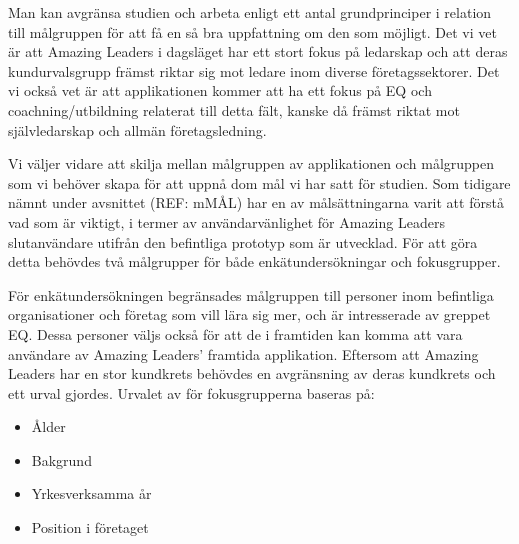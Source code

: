 Man kan avgränsa studien och arbeta enligt ett antal grundprinciper i relation till målgruppen för att få en så bra uppfattning om den som möjligt. Det vi vet är att Amazing Leaders i dagsläget har ett stort fokus på ledarskap och att deras kundurvalsgrupp främst riktar sig mot ledare inom diverse företagssektorer. Det vi också vet är att applikationen kommer att ha ett fokus på EQ och coachning/utbildning relaterat till detta fält, kanske då främst riktat mot självledarskap och allmän företagsledning. 
\newline

Vi väljer vidare att skilja mellan målgruppen av applikationen och målgruppen som vi behöver skapa för att uppnå dom mål vi har satt för studien. Som tidigare nämnt under avsnittet (REF: mMÅL) har en av målsättningarna varit att förstå vad som är viktigt, i termer av användarvänlighet för Amazing Leaders slutanvändare utifrån den befintliga prototyp som är utvecklad. För att göra detta behövdes två målgrupper för både enkätundersökningar och fokusgrupper.
\newline

För enkätundersökningen begränsades målgruppen till personer inom befintliga organisationer och företag som vill lära sig mer, och är intresserade av greppet EQ. Dessa personer väljs också för att de i framtiden kan komma att vara användare av Amazing Leaders' framtida applikation. Eftersom att Amazing Leaders har en stor kundkrets behövdes en avgränsning av deras kundkrets och ett urval gjordes. Urvalet av för fokusgrupperna baseras på: 
\begin{itemize}
\item Ålder
\item Bakgrund 
\item Yrkesverksamma år
\item Position i företaget 
\end{itemize}





